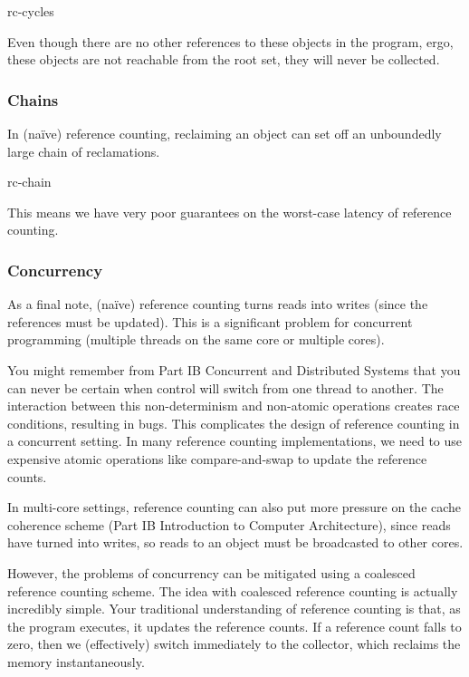 \begin{center}
    {rc-cycles}
\end{center}

Even though there are no other references to these objects in the program, ergo, these objects are not reachable from the root set, they will never be collected.

\subsubsection{Chains}
In (naïve) reference counting, reclaiming an object can set off an unboundedly large chain of reclamations.

\begin{center}
    {rc-chain}
\end{center}

This means we have very poor guarantees on the worst-case latency of reference counting.

\subsubsection{Concurrency\optional}\label{section:coalesced-reference-counting}
As a final note, (naïve) reference counting turns reads into writes (since the references must be updated). This is a significant problem for concurrent programming (multiple threads on the same core or multiple cores). 

You might remember from \textsf{Part IB Concurrent and Distributed Systems} that you can never be certain when control will switch from one thread to another. The interaction between this non-determinism and non-atomic operations creates race conditions, resulting in bugs. This complicates the design of reference counting in a concurrent setting. In many reference counting implementations, we need to use expensive atomic operations like compare-and-swap to update the reference counts.

In multi-core settings, reference counting can also put more pressure on the cache coherence scheme (\textsf{Part IB Introduction to Computer Architecture}), since reads have turned into writes, so reads to an object must be broadcasted to other cores.

However, the problems of concurrency can be mitigated using a coalesced reference counting scheme. The idea with coalesced reference counting is actually incredibly simple. Your traditional understanding of reference counting is that, as the program executes, it updates the reference counts. If a reference count falls to zero, then we (effectively) switch immediately to the collector, which reclaims the memory instantaneously.

